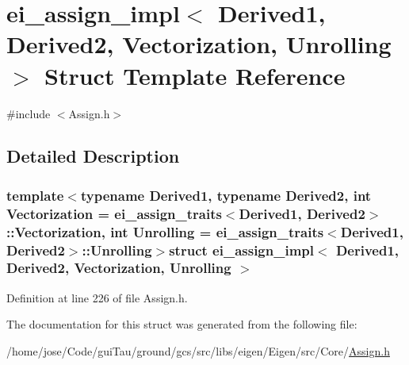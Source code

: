 \hypertarget{structei__assign__impl}{\section{ei\-\_\-assign\-\_\-impl$<$ Derived1, Derived2, Vectorization, Unrolling $>$ Struct Template Reference}
\label{structei__assign__impl}
}


{\ttfamily \#include $<$Assign.\-h$>$}



\subsection{Detailed Description}
\subsubsection*{template$<$typename Derived1, typename Derived2, int Vectorization = ei\-\_\-assign\-\_\-traits$<$\-Derived1, Derived2$>$\-::\-Vectorization, int Unrolling = ei\-\_\-assign\-\_\-traits$<$\-Derived1, Derived2$>$\-::\-Unrolling$>$struct ei\-\_\-assign\-\_\-impl$<$ Derived1, Derived2, Vectorization, Unrolling $>$}



Definition at line 226 of file Assign.\-h.



The documentation for this struct was generated from the following file\-:\begin{DoxyCompactItemize}
\item 
/home/jose/\-Code/gui\-Tau/ground/gcs/src/libs/eigen/\-Eigen/src/\-Core/\hyperlink{_assign_8h}{Assign.\-h}\end{DoxyCompactItemize}
